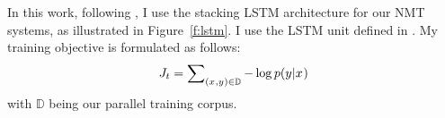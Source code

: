 In this work, following \cite{sutskever14,luong15}, I use the stacking LSTM architecture for our NMT systems, as illustrated in Figure~\ref{f:lstm}.
I use the LSTM unit defined in \cite{zaremba14}. My training objective is formulated as follows:
\begin{equation}
J_t = \sum_{(x_{},y_{}) \in \mathbb{D}} \nolimits -\log p(y_{}|x_{})
\label{e:j_t}
\end{equation}
with $\mathbb{D}$ being our parallel training corpus.
